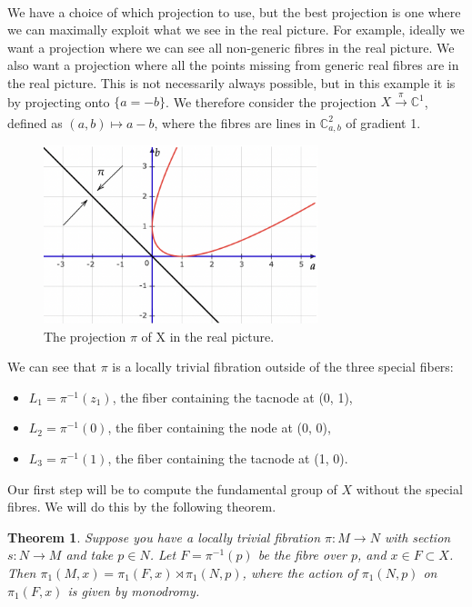 \documentclass[oneside,reqno]{amsart}
\newtheorem{thm}{Theorem}[section]
\theoremstyle{definition}
\theoremstyle{definition}
\theoremstyle{definition}
\theoremstyle{definition}
\newcommand{\CC}{\mathbb{C}}
\begin{document}
\\
\newline
We have a choice of which projection to use, but the best projection is one where we can maximally exploit what we see in the real picture. For example, ideally we want a projection where we can see all non-generic fibres in the real picture. We also want a projection where all the points missing from generic real fibres are in the real picture. This is not necessarily always possible, but in this example it is by projecting onto $\{ a=-b \}$. We therefore consider the projection $X \xrightarrow[]{\pi} \CC^1$, defined as $(a,b) \mapsto a-b$, where the fibres are lines in $\CC^2_{a,b}$ of gradient 1.
\begin{figure}[!h]
    \centering
    \includegraphics[width=8cm]{rank2exmp/projection1.png}
    \caption{The projection $\pi$ of X in the real picture.}
    \label{projection1}
\end{figure}
We can see that $\pi$ is a locally trivial fibration outside of the three special fibers:
\begin{itemize}
    \item $L_1 = \pi^{-1}(z_1)$, the fiber containing the tacnode at (0, 1), \\
    \item $L_2 = \pi^{-1}(0)$, the fiber containing the node at (0, 0), \\
    \item $L_3= \pi^{-1}(1)$, the fiber containing the tacnode at (1, 0).
\end{itemize}
Our first step will be to compute the fundamental group of $X$ without the special fibres. We will do this by the following theorem.
\begin{thm}\cite[Theorem 2.1]{cogolludo}
\label{locallytriv}
Suppose you have a locally trivial fibration $\pi : M \to N$ with section $s : N\to M$ and take $p \in N $. Let $F = \pi^{-1}(p)$ be the fibre over $p$, and $x\in F\subset X$. Then $\pi_1(M,x) = \pi_1(F,x) \rtimes \pi_1(N,p)$, where the action of $\pi_1(N,p)$ on $\pi_1(F,x)$ is given by monodromy. 
\end{thm}
\end{document}
